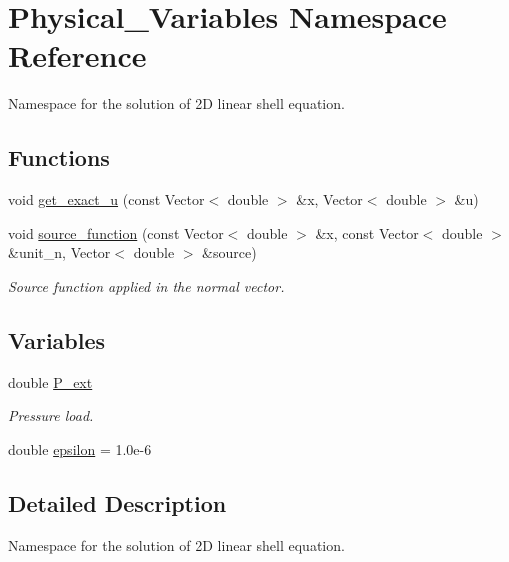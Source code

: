 \hypertarget{namespacePhysical__Variables}{}\section{Physical\+\_\+\+Variables Namespace Reference}
\label{namespacePhysical__Variables}


Namespace for the solution of 2D linear shell equation.  


\subsection*{Functions}
\begin{DoxyCompactItemize}
\item 
void \hyperlink{namespacePhysical__Variables_af90d0c580c57b1152fd1cc7046055031}{get\+\_\+exact\+\_\+u} (const Vector$<$ double $>$ \&x, Vector$<$ double $>$ \&u)
\item 
void \hyperlink{namespacePhysical__Variables_a36f0d0dc5f8aa4eafd7c4d6fe943c4e8}{source\+\_\+function} (const Vector$<$ double $>$ \&x, const Vector$<$ double $>$ \&unit\+\_\+n, Vector$<$ double $>$ \&source)
\begin{DoxyCompactList}\small\item\em Source function applied in the normal vector. \end{DoxyCompactList}\end{DoxyCompactItemize}
\subsection*{Variables}
\begin{DoxyCompactItemize}
\item 
double \hyperlink{namespacePhysical__Variables_a58adc76bae4751599143c613f9100904}{P\+\_\+ext}
\begin{DoxyCompactList}\small\item\em Pressure load. \end{DoxyCompactList}\item 
double \hyperlink{namespacePhysical__Variables_ac374cc60da0f1e5df3fc48a3c9ce1d74}{epsilon} = 1.\+0e-\/6
\end{DoxyCompactItemize}


\subsection{Detailed Description}
Namespace for the solution of 2D linear shell equation. 

